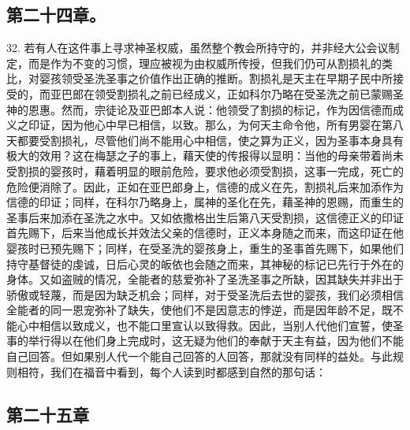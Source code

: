 
\subsection{第二十四章。}

32. 若有人在这件事上寻求神圣权威，虽然整个教会所持守的，并非经大公会议制定，而是作为不变的习惯，理应被视为由权威所传授，但我们仍可从割损礼的类比，对婴孩领受圣洗圣事之价值作出正确的推断。割损礼是天主在早期子民中所接受的，而亚巴郎在领受割损礼之前已经成义，正如科尔乃略在受圣洗之前已蒙赐圣神的恩惠。然而，宗徒论及亚巴郎本人说：他领受了割损的标记，作为因信德而成义之印证，因为他心中早已相信，以致。那么，为何天主命令他，所有男婴在第八天都要受割损礼，尽管他们尚不能用心中相信，使之算为正义，因为圣事本身具有极大的效用？这在梅瑟之子的事上，藉天使的传报得以显明：当他的母亲带着尚未受割损的婴孩时，藉着明显的眼前危险，要求他必须受割损，这事一完成，死亡的危险便消除了。因此，正如在亚巴郎身上，信德的成义在先，割损礼后来加添作为信德的印证；同样，在科尔乃略身上，属神的圣化在先，藉圣神的恩赐，而重生的圣事后来加添在圣洗之水中。又如依撒格出生后第八天受割损，这信德正义的印证首先赐下，后来当他成长并效法父亲的信德时，正义本身随之而来，而这印证在他婴孩时已预先赐下；同样，在受圣洗的婴孩身上，重生的圣事首先赐下，如果他们持守基督徒的虔诚，日后心灵的皈依也会随之而来，其神秘的标记已先行于外在的身体。又如盗贼的情况，全能者的慈爱弥补了圣洗圣事之所缺，因其缺失并非出于骄傲或轻蔑，而是因为缺乏机会；同样，对于受圣洗后去世的婴孩，我们必须相信全能者的同一恩宠弥补了缺失，使他们不是因意志的悖逆，而是因年龄不足，既不能心中相信以致成义，也不能口里宣认以致得救。因此，当别人代他们宣誓，使圣事的举行得以在他们身上完成时，这无疑为他们的奉献于天主有益，因为他们不能自己回答。但如果别人代一个能自己回答的人回答，那就没有同样的益处。与此规则相符，我们在福音中看到，每个人读到时都感到自然的那句话：\par


\subsection{第二十五章}

